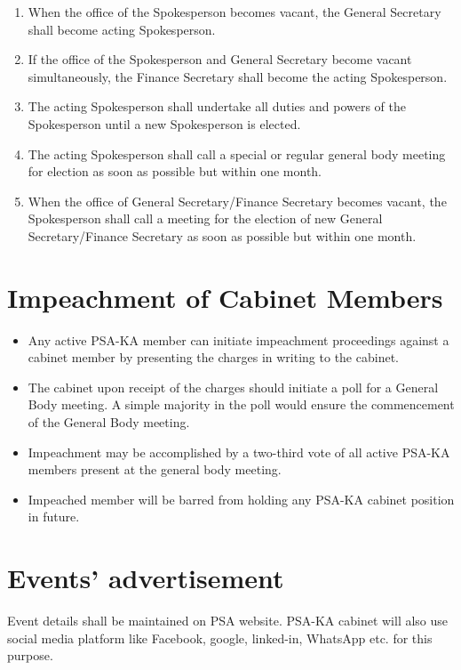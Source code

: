 \begin{enumerate}
	\item When the office of the Spokesperson becomes vacant, the General Secretary shall become acting Spokesperson. 
	\item If the office of the Spokesperson and General Secretary become vacant simultaneously, the Finance Secretary shall become the acting Spokesperson. 
	\item The acting Spokesperson shall undertake all duties and powers of the Spokesperson until a new Spokesperson is elected. 
	\item The acting Spokesperson shall call a special or regular general body meeting for election as soon as possible but within one month. 
	\item When the office of General Secretary/Finance Secretary becomes vacant, the Spokesperson shall call a meeting for the election of new General Secretary/Finance Secretary as soon as possible but within one month. 
\end{enumerate}
\section{Impeachment of Cabinet Members }
\begin{itemize}
	\item Any active PSA-KA member can initiate impeachment proceedings against a cabinet member by presenting the charges in writing to the cabinet.  
	\item The cabinet upon receipt of the charges should initiate a poll for a General Body meeting. A simple majority in the poll would ensure the commencement of the General Body meeting.  
	\item Impeachment may be accomplished by a two-third vote of all active PSA-KA members present at the general body meeting.  
	\item Impeached member will be barred from holding any PSA-KA cabinet position in future. 
\end{itemize}
\section{Events’ advertisement }
Event details shall be maintained on PSA website. PSA-KA cabinet will also use social media platform like Facebook, google, linked-in, WhatsApp etc. for this purpose. 
